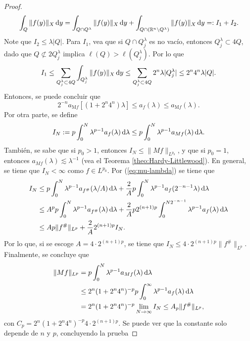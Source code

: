 \begin{proof}
	\begin{equation*}
		\int_Q\|f(y)\|_X\mathop{}\!\mathrm{d} y = \int_{Q\cap Q^\lambda} \|f(y)\|_X\mathop{}\!\mathrm{d} y + \int_{Q\cap (\mathbb{R}^n\setminus Q^\lambda)} \|f(y)\|_X\mathop{}\!\mathrm{d} y =: I_1 + I_2.
	\end{equation*}
	Note que $I_2 \leq \lambda |Q|$. Para $I_1$, vea que si $Q\cap Q_j^\lambda$ es no vacío, entonces $Q_j^\lambda \subset 4Q$, dado que $Q \not\subset 2Q_j^\lambda$ implica $\ell(Q) > \ell(Q_j^\lambda)$. Por lo que 
	\begin{equation*}
		I_1 \leq \sum_{Q_j^\lambda\subset4Q} \int_{Q_j^\lambda} \|f(y)\|_X\mathop{}\!\mathrm{d} y \leq \sum_{Q_j^\lambda\subset4Q} 2^n\lambda |Q_j^\lambda| \leq 2^n4^n\lambda|Q|.
	\end{equation*}
	Entonces, se puede concluir que 
	\begin{equation}\label{eq:mu-density}
		2^{-n}a_{\mathrm{M}f}[(1+2^n4^n)\lambda] \leq a_{f}(\lambda) \leq a_{\mathrm{M}f}(\lambda).
	\end{equation}
	Por otra parte, se define 
	\begin{equation*}
		I_N := p\int_0^N\lambda^{p-1}a_{f}(\lambda)\mathop{}\!\mathrm{d} \lambda \leq p\int_0^N\lambda^{p-1}a_{Mf}(\lambda)\mathop{}\!\mathrm{d} \lambda.
	\end{equation*}
	También, se sabe que si $p_0>1$, entonces $I_N\leq \|Mf\|_{L^{p_0}}$, y que si $p_0=1$, entonces $a_{Mf}(\lambda)\lesssim \lambda^{-1}$ (vea el Teorema \ref{theo:Hardy-Littlewood}). En general, se tiene que $I_N<\infty$ como $f\in L^{p_0}$. Por (\ref{eq:mu-lambda}) se tiene que 
	\begin{align*}
		I_N & \leq p\int_0^N\lambda^{p-1}a_{f^\#}(\lambda/A)\mathop{}\!\mathrm{d}\lambda + \frac{2}{A}p\int_0^N\lambda^{p-1}a_{f}(2^{-n-1}\lambda)\mathop{}\!\mathrm{d} \lambda \\
		& \leq A^p p\int_0^N\lambda^{p-1}a_{f^\#}(\lambda)\mathop{}\!\mathrm{d}\lambda +\frac{2}{A} p2^{(n+1)p} \int_0^{N2^{-n-1}}\lambda^{p-1} a_{f}(\lambda)\mathop{}\!\mathrm{d}\lambda \\
		& \leq Ap\|f^\#\|_{L^p} + \frac{2}{A}2^{(n+1)p} I_N.
	\end{align*}
	Por lo que, si se escoge $A=4\cdot2^{(n+1)p}$, se tiene que $I_N \leq 4\cdot 2^{(n+1)p}\|f^\#\|_{L^p}$. Finalmente, se concluye que 
	\begin{align*}
		\|Mf\|_{L^p} & = p\int_0^N\lambda^{p-1}a_{Mf}(\lambda)\mathop{}\!\mathrm{d} \lambda \\
		& \leq 2^n(1+2^n4^n)^{-p} p\int_0^\infty\lambda^{p-1}a_{f}(\lambda)\mathop{}\!\mathrm{d} \lambda \\
		& =2^n(1+2^n4^n)^{-p}  \lim_{N\to\infty} I_N \leq A_p\|f^\#\|_{L^p},
	\end{align*}
	con $C_p = 2^n(1+2^n4^n)^{-p} 4\cdot 2^{(n+1)p}$. Se puede ver que la constante solo depende de $n$ y $p$, concluyendo la prueba
\end{proof}
